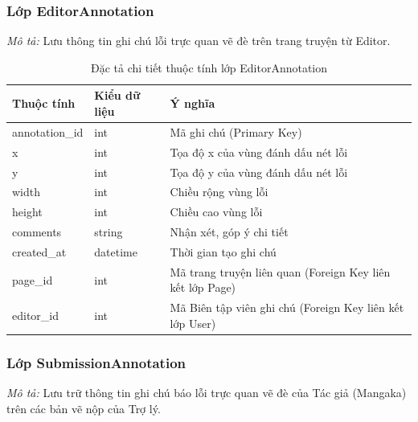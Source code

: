 \subsubsection{Lớp EditorAnnotation}
\textit{Mô tả:} Lưu thông tin ghi chú lỗi trực quan vẽ đè trên trang truyện từ Editor.

\begin{table}[H]
\centering
\renewcommand{\arraystretch}{1.3}
\begin{tabularx}{\textwidth}{|p{4cm}|p{3cm}|>{\raggedright\arraybackslash}X|}
\hline
\rowcolor{tableheader}
\textbf{Thuộc tính} & \textbf{Kiểu dữ liệu} & \textbf{Ý nghĩa} \\ \hline
annotation\_id & int & Mã ghi chú (Primary Key) \\ \hline
x & int & Tọa độ x của vùng đánh dấu nét lỗi \\ \hline
y & int & Tọa độ y của vùng đánh dấu nét lỗi \\ \hline
width & int & Chiều rộng vùng lỗi \\ \hline
height & int & Chiều cao vùng lỗi \\ \hline
comments & string & Nhận xét, góp ý chi tiết \\ \hline
created\_at & datetime & Thời gian tạo ghi chú \\ \hline
page\_id & int & Mã trang truyện liên quan (Foreign Key liên kết lớp Page) \\ \hline
editor\_id & int & Mã Biên tập viên ghi chú (Foreign Key liên kết lớp User) \\ \hline
\end{tabularx}
\caption{Đặc tả chi tiết thuộc tính lớp EditorAnnotation}
\label{tab:class_editorannotation}
\end{table}


\subsubsection{Lớp SubmissionAnnotation}
\textit{Mô tả:} Lưu trữ thông tin ghi chú báo lỗi trực quan vẽ đè của Tác giả (Mangaka) trên các bản vẽ nộp của Trợ lý.

